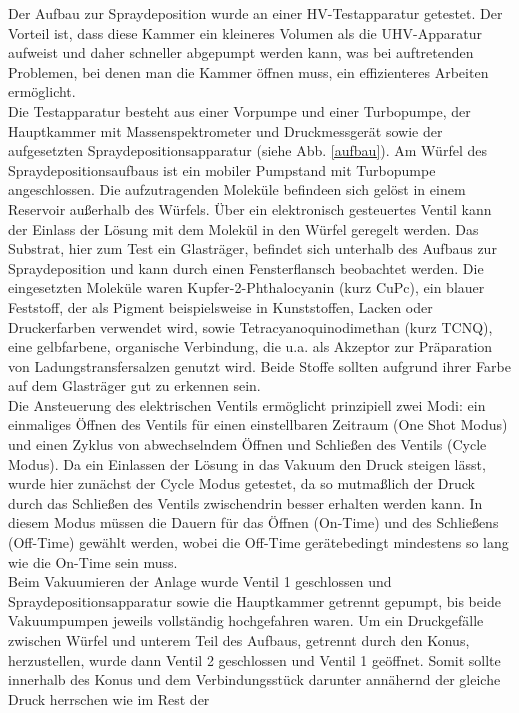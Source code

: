 Der Aufbau zur Spraydeposition wurde an einer HV-Testapparatur getestet. Der
Vorteil ist, dass diese Kammer ein kleineres Volumen als die UHV-Apparatur aufweist und daher
schneller abgepumpt werden kann, was bei auftretenden Problemen, bei denen man die Kammer öffnen
muss, ein effizienteres Arbeiten ermöglicht.
\\
Die Testapparatur besteht aus einer Vorpumpe und  einer Turbopumpe,
der Hauptkammer mit Massenspektrometer und Druckmessgerät sowie der aufgesetzten
Spraydepositionsapparatur (siehe Abb. \ref{aufbau}). Am Würfel des Spraydepositionsaufbaus ist ein
mobiler Pumpstand mit Turbopumpe angeschlossen.
Die aufzutragenden Moleküle befindeen sich gelöst in einem Reservoir außerhalb des Würfels. Über ein
elektronisch gesteuertes Ventil kann der Einlass der Lösung mit dem Molekül in den Würfel geregelt
werden. Das Substrat, hier zum Test ein Glasträger, befindet sich unterhalb des Aufbaus zur
Spraydeposition und kann durch einen Fensterflansch beobachtet werden. Die eingesetzten Moleküle
waren Kupfer-2-Phthalocyanin (kurz CuPc), ein blauer Feststoff, der als Pigment beispielsweise in
Kunststoffen, Lacken oder Druckerfarben verwendet wird, sowie 
Tetracyanoquinodimethan (kurz TCNQ), eine gelbfarbene,
organische Verbindung, die u.a. als Akzeptor zur Präparation von Ladungstransfersalzen genutzt wird.
Beide Stoffe sollten aufgrund ihrer Farbe auf dem Glasträger gut zu erkennen sein. 
\\
Die Ansteuerung des elektrischen Ventils ermöglicht prinzipiell zwei Modi: ein einmaliges Öffnen des
Ventils für einen einstellbaren Zeitraum (One Shot Modus) und einen Zyklus von abwechselndem
Öffnen und Schließen des Ventils (Cycle Modus). Da ein Einlassen der Lösung in das Vakuum
den Druck steigen lässt, wurde hier zunächst der Cycle Modus getestet, da so mutmaßlich der Druck
durch das Schließen des Ventils zwischendrin besser erhalten werden kann. In diesem Modus müssen
die Dauern für das Öffnen (On-Time) und des Schließens (Off-Time) gewählt werden, wobei die Off-Time
gerätebedingt mindestens so lang wie die On-Time sein muss.
\\
Beim Vakuumieren der Anlage wurde Ventil 1  geschlossen und Spraydepositionsapparatur sowie die 
 Hauptkammer getrennt gepumpt, bis beide Vakuumpumpen jeweils vollständig hochgefahren
 waren. Um ein Druckgefälle zwischen Würfel und unterem Teil des Aufbaus, getrennt
 durch den Konus, herzustellen, wurde dann Ventil 2 geschlossen und Ventil 1 geöffnet. Somit sollte
 innerhalb des Konus und dem Verbindungsstück darunter annähernd der gleiche Druck herrschen wie im Rest der
